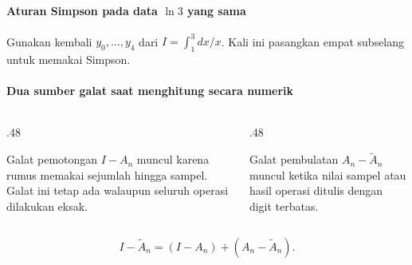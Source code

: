\documentclass{../../kalkulus-ppt}
\begin{document}
\begin{frame}{\insertsection}
    \framesubtitle{Aturan Simpson pada data $\ln 3$ yang sama}
    \begin{contoh}
        Gunakan kembali $y_0,\ldots,y_4$ dari $I=\int_1^3 dx/x$.
        Kali ini pasangkan empat subselang untuk memakai Simpson.
    \end{contoh}
\end{frame}

\begin{frame}{\insertsection}
    \framesubtitle{Dua sumber galat saat menghitung secara numerik}
    \begin{columns}[t,onlytextwidth]
        \begin{column}{.48\textwidth}
            \begin{block}{Galat pemotongan}
                $I-A_n$ muncul karena rumus memakai sejumlah hingga sampel.
                Galat ini tetap ada walaupun seluruh operasi dilakukan eksak.
            \end{block}
        \end{column}
        \begin{column}{.48\textwidth}
            \begin{block}{Galat pembulatan}
                $A_n-\widetilde A_n$ muncul ketika nilai sampel atau
                hasil operasi ditulis dengan digit terbatas.
            \end{block}
        \end{column}
    \end{columns}
    \[
        I-\widetilde A_n=(I-A_n)+(A_n-\widetilde A_n).
    \]
\end{frame}
\end{document}
